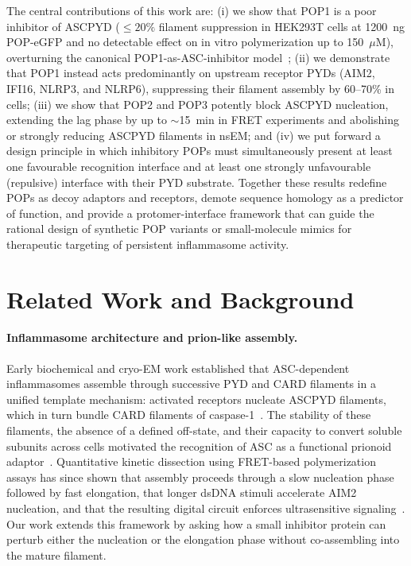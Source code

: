 The central contributions of this work are: (i) we show that POP1 is a poor inhibitor of ASCPYD ($\leq 20\%$ filament suppression in HEK293T cells at 1200~ng POP-eGFP and no detectable effect on in vitro polymerization up to 150~$\mu$M), overturning the canonical POP1-as-ASC-inhibitor model~\cite{dealmeida2015pyrin}; (ii) we demonstrate that POP1 instead acts predominantly on upstream receptor PYDs (AIM2, IFI16, NLRP3, and NLRP6), suppressing their filament assembly by 60--70\% in cells; (iii) we show that POP2 and POP3 potently block ASCPYD nucleation, extending the lag phase by up to $\sim$15~min in FRET experiments and abolishing or strongly reducing ASCPYD filaments in nsEM; and (iv) we put forward a design principle in which inhibitory POPs must simultaneously present at least one favourable recognition interface and at least one strongly unfavourable (repulsive) interface with their PYD substrate. Together these results redefine POPs as decoy adaptors and receptors, demote sequence homology as a predictor of function, and provide a protomer-interface framework that can guide the rational design of synthetic POP variants or small-molecule mimics for therapeutic targeting of persistent inflammasome activity.

\section{Related Work and Background}

\paragraph{Inflammasome architecture and prion-like assembly.} Early biochemical and cryo-EM work established that ASC-dependent inflammasomes assemble through successive PYD and CARD filaments in a unified template mechanism: activated receptors nucleate ASCPYD filaments, which in turn bundle CARD filaments of caspase-1~\cite{lu2014unified,shen2019nlrp6,sharif2019nek7,andreeva2021nlrp3,hochheiser2022directionality,hochheiser2022seeding}. The stability of these filaments, the absence of a defined off-state, and their capacity to convert soluble subunits across cells motivated the recognition of ASC as a functional prionoid adaptor~\cite{cai2014prion,franklin2014adaptor}. Quantitative kinetic dissection using FRET-based polymerization assays has since shown that assembly proceeds through a slow nucleation phase followed by fast elongation, that longer dsDNA stimuli accelerate AIM2 nucleation, and that the resulting digital circuit enforces ultrasensitive signaling~\cite{matyszewski2018digital,mazanek2019fret,morrone2015assembly}. Our work extends this framework by asking how a small inhibitor protein can perturb either the nucleation or the elongation phase without co-assembling into the mature filament.

